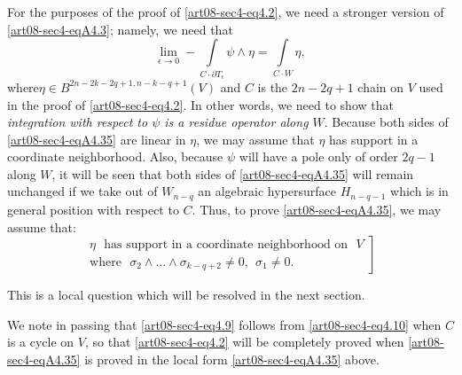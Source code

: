 For the purposes of the proof of \eqref{art08-sec4-eq4.2}, we need a stronger version of \eqref{art08-sec4-eqA4.3}; namely, we need that
\begin{equation*}
\lim\limits_{\epsilon\to 0}-\int\limits_{C\cdot \partial T_{\epsilon}}\psi \wedge \eta=\int\limits_{C\cdot W}\eta,\tag{A4.35}\label{art08-sec4-eqA4.35}
\end{equation*}
where\pageoriginale $\eta\in B^{2n-2k-2q+1,n-k-q+1}(V)$ and $C$ is the $2n-2q+1$ chain on $V$ used in the proof of \eqref{art08-sec4-eq4.2}. In other words, we need to show that {\em integration with respect to $\psi$ is a residue operator along $W$}. Because both sides of \eqref{art08-sec4-eqA4.35} are linear in $\eta$, we may assume that $\eta$ has support in a coordinate neighborhood. Also, because $\psi$ will have a pole only of order $2q-1$ along $W$, it will be seen that both sides of \eqref{art08-sec4-eqA4.35} will remain unchanged if we take out of $W_{n-q}$ an algebraic hypersurface $H_{n-q-1}$ which is in general position with respect to $C$. Thus, to prove \eqref{art08-sec4-eqA4.35}, we may assume that:
\begin{equation*}
\left.
\begin{array}{l}
\eta\text{~ has support in a coordinate neighborhood on~ } V\\[3pt]
\text{where~ } \sigma_{2}\wedge\ldots\wedge \sigma_{k-q+2}\neq 0, \ \ \sigma_{1}\neq  0.
\end{array}\right]\tag{A4.36}\label{art08-sec4-eqA4.36}
\end{equation*}

This is a local question which will be resolved in the next section.

We note in passing that \eqref{art08-sec4-eq4.9} follows from \eqref{art08-sec4-eq4.10} when $C$ is a cycle on $V$, so that \eqref{art08-sec4-eq4.2} will be completely proved when \eqref{art08-sec4-eqA4.35} is proved in the local form \eqref{art08-sec4-eqA4.35} above.

